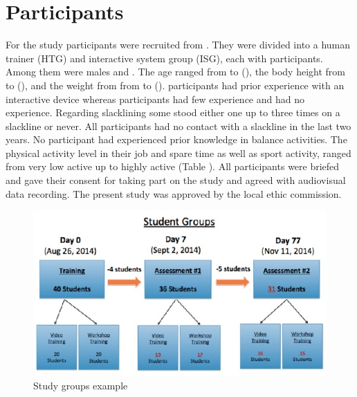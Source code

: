 \section{Participants}
For the study  participants were recruited from . They were divided into a human trainer (HTG) and interactive system group (ISG), each with  participants. Among them  were males and . The age ranged from  to  (), the body height from  to  (), and the weight from from  to  ().
 participants had prior experience with an interactive device whereas  participants had few experience and  had no experience. Regarding slacklining some stood either one up to three times on a slackline or never. All participants had no contact with a slackline in the last two years. No participant had experienced prior knowledge in balance activities. The physical activity level in their job and spare time as well as sport activity, ranged from very low active up to highly active (Table ). All participants were briefed and gave their consent for taking part on the study and agreed with audiovisual data recording. The present study was approved by the local ethic commission. 


\begin{figure}[htb]
	\centering
	\begin{minipage}[t]{1\linewidth}
		\centering
		\includegraphics[width=0.8\linewidth]{Pictures/6_studyGroupsExample}
		\caption{Study groups example}
		\label{fig:6_studyGroups}
	\end{minipage}
\end{figure}